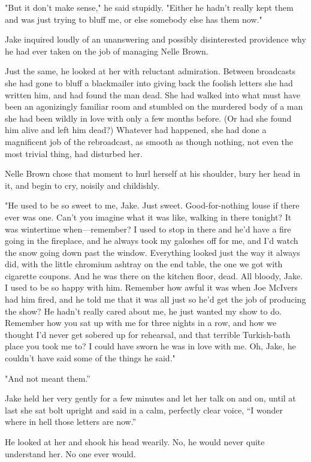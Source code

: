 \documentclass{novel}
\begin{document}
"But it don't make sense," he said stupidly. "Either he hadn't really kept them and was just trying to bluff me, or else somebody else has them now."

Jake inquired loudly of an unanswering and possibly disinterested providence why he had ever taken on the job of managing Nelle Brown.

Just the same, he looked at her with reluctant admiration. Between broadcasts she had gone to bluff a blackmailer into giving back the foolish letters she had written him, and had found the man dead. She had walked into what must have been an agonizingly familiar room and stumbled on the murdered body of a man she had been wildly in love with only a few months before. (Or had she found him alive and left him dead?) Whatever had happened, she had done a magnificent job of the rebroadcast, as smooth as though nothing, not even the most trivial thing, had disturbed her.

Nelle Brown chose that moment to hurl herself at his shoulder, bury her head in it, and begin to cry, noisily and childishly.

"He used to be so sweet to me, Jake. Just sweet. Good-for-nothing louse if there ever was one. Can't you imagine what it was like, walking in there tonight? It was wintertime when—remember? I used to stop in there and he'd have a fire going in the fireplace, and he always took my galoshes off for me, and I'd watch the snow going down past the window. Everything looked just the way it always did, with the little chromium ashtray on the end table, the one we got with cigarette coupons. And he was there on the kitchen floor, dead. All bloody, Jake. I used to be so happy with him. Remember how awful it was when Joe McIvers had him fired, and he told me that it was all just so he'd get the job of producing the show? He hadn't really cared about me, he just wanted my show to do. Remember how you sat up with me for three nights in a row, and how we thought I'd never get sobered up for rehearsal, and that terrible Turkish-bath place you took me to? I could have sworn he was in love with me. Oh, Jake, he couldn't have said some of the things he said."

"And not meant them.”

Jake held her very gently for a few minutes and let her talk on and on, until at last she sat bolt upright and said in a calm, perfectly clear voice, “I wonder where in hell those letters are now.”

He looked at her and shook his head wearily. No, he would never quite understand her. No one ever would.
\end{document}
